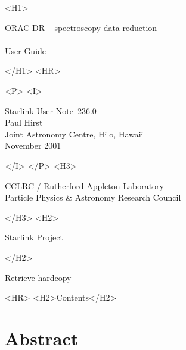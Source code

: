 \documentclass[twoside,11pt]{article}
\newcommand{\stardoccategory}  {Starlink User Note}
\newcommand{\stardocsource}    {sun\stardocnumber}
\newcommand{\stardocnumber}    {236.0}
\newcommand{\stardocauthors}   {Paul Hirst \\
                                Joint Astronomy Centre, Hilo, Hawaii}
\newcommand{\stardocdate}      {November 2001}
\newcommand{\stardoctitle}     {ORAC-DR -- spectroscopy data reduction}
\newcommand{\stardocversion}   {}
\newcommand{\stardocmanual}    {User Guide}
\newcommand{\htmladdnormallink}[2]{#1}
\newcommand{\htmladdimg}[1]{}
\newcommand{\htmlref}[2]{#1}
\newcommand{\htmladdtonavigation}[1]{}
\newcommand{\xlabel}[1]{}
\renewcommand{\_}{\texttt{\symbol{95}}}
\begin{document}
\begin{htmlonly}
   \xlabel{}
   \begin{rawhtml} <H1> \end{rawhtml}
      \stardoctitle\\
      \stardocversion\\
      \stardocmanual
   \begin{rawhtml} </H1> <HR> \end{rawhtml}


   \begin{rawhtml} <P> <I> \end{rawhtml}
   \stardoccategory\ \stardocnumber \\
   \stardocauthors \\
   \stardocdate
   \begin{rawhtml} </I> </P> <H3> \end{rawhtml}
      \htmladdnormallink{CCLRC / Rutherford Appleton Laboratory}
                        {http://www.cclrc.ac.uk} \\
      \htmladdnormallink{Particle Physics \& Astronomy Research Council}
                        {http://www.pparc.ac.uk} \\
   \begin{rawhtml} </H3> <H2> \end{rawhtml}
      \htmladdnormallink{Starlink Project}{http://www.starlink.rl.ac.uk/}
   \begin{rawhtml} </H2> \end{rawhtml}
   \htmladdnormallink{\htmladdimg{source.gif} Retrieve hardcopy}
      {http://www.starlink.rl.ac.uk/cgi-bin/hcserver?\stardocsource}\\

  \label{stardoccontents}
  \begin{rawhtml} 
    <HR>
    <H2>Contents</H2>
  \end{rawhtml}
  \htmladdtonavigation{\htmlref{\htmladdimg{contents_motif.gif}}
        {stardoccontents}}

  \section{\xlabel{abstract}Abstract}
\end{htmlonly}
\end{document}
